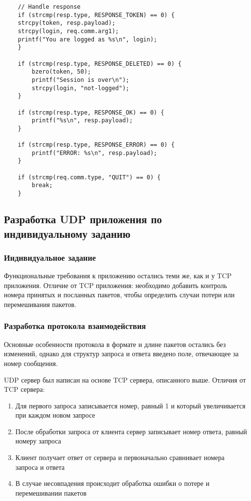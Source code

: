 \begin{lstlisting}
	// Handle response
	if (strcmp(resp.type, RESPONSE_TOKEN) == 0) {
	strcpy(token, resp.payload);
	strcpy(login, req.comm.arg1);
	printf("You are logged as %s\n", login);
	}
	
	if (strcmp(resp.type, RESPONSE_DELETED) == 0) {
		bzero(token, 50);
		printf("Session is over\n");
		strcpy(login, "not-logged");
	}
	
	if (strcmp(resp.type, RESPONSE_OK) == 0) {
		printf("%s\n", resp.payload);
	}
	
	if (strcmp(resp.type, RESPONSE_ERROR) == 0) {
		printf("ERROR: %s\n", resp.payload);
	}
	
	if (strcmp(req.comm.type, "QUIT") == 0) {
		break;
	}
\end{lstlisting}

\subsection{Разработка UDP приложения по индивидуальному заданию}
\subsubsection{Индивидуальное задание}
Функциональные требования к приложению остались теми же, как и у TCP приложения. Отличие от TCP приложения: необходимо добавить контроль номера принятых и посланных пакетов, чтобы определить случаи потери или перемешивания пакетов.
\subsubsection{Разработка протокола взаимодействия}
Основные особенности протокола в формате и длине пакетов остались без изменений, однако для структур запроса и ответа введено поле, отвечающее за номер сообщения.

UDP сервер был написан на основе TCP сервера, описанного выше. Отличия от TCP сервера:
\begin{enumerate}
\item Для первого запроса записывается номер, равный 1 и который увеличивается при каждом новом запросе 
\item После обработки запроса от клиента сервер записывает номер ответа, равный номеру запроса
\item Клиент получает ответ от сервера и первоначально сравнивает номера запроса и ответа
\item В случае несовпадения происходит обработка ошибки о потере и перемешивании пакетов
\end{enumerate}

